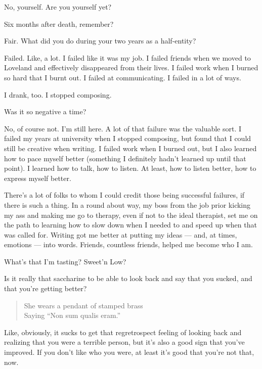 \begin{paracol}{2}
\begin{leftcolumn}
\begin{ally}
No, yourself. Are you yourself yet?
\end{ally}
Six months after death, remember?

\begin{ally}
Fair. What did you do during your two years as a half-entity?
\end{ally}
Failed. Like, a lot. I failed like it was my job. I failed friends when we moved to Loveland and effectively disappeared from their lives. I failed work when I burned so hard that I burnt out. I failed at communicating. I failed in a lot of ways.

I drank, too. I stopped composing.

\begin{ally}
Was it so negative a time?
\end{ally}
No, of course not. I'm still here. A lot of that failure was the valuable sort. I failed my years at university when I stopped composing, but found that I could still be creative when writing. I failed work when I burned out, but I also learned how to pace myself better (something I definitely hadn't learned up until that point). I learned how to talk, how to listen. At least, how to listen better, how to express myself better.

There's a lot of folks to whom I could credit those being successful failures, if there is such a thing. In a round about way, my boss from the job prior kicking my ass and making me go to therapy, even if not to the ideal therapist, set me on the path to learning how to slow down when I needed to and speed up when that was called for. Writing got me better at putting my ideas --- and, at times, emotions --- into words. Friends, countless friends, helped me become who I am.

\begin{ally}
What's that I'm tasting? Sweet'n Low?
\end{ally}
Is it really that saccharine to be able to look back and say that you sucked, and that you're getting better?

\begin{verse}
She wears a pendant of stamped brass\\
\vin Saying ``Non sum qualis eram.''
\end{verse}

Like, obviously, it sucks to get that regretrospect feeling of looking back and realizing that you were a terrible person, but it's also a good sign that you've improved. If you don't like who you were, at least it's good that you're not that, now.


\end{leftcolumn}
\end{paracol}
